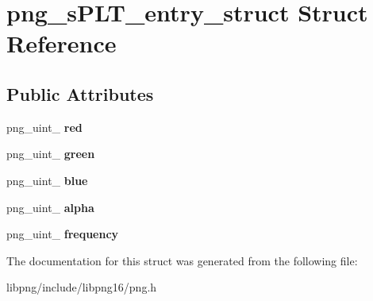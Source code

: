 \hypertarget{structpng__sPLT__entry__struct}{\section{png\-\_\-s\-P\-L\-T\-\_\-entry\-\_\-struct Struct Reference}
\label{structpng__sPLT__entry__struct}
}
\subsection*{Public Attributes}
\begin{DoxyCompactItemize}
\item 
\hypertarget{structpng__sPLT__entry__struct_a05ba3cef8aa2c43d1f52c0300c525fd9}{png\-\_\-uint\-\_ {\bfseries red}}\label{structpng__sPLT__entry__struct_a05ba3cef8aa2c43d1f52c0300c525fd9}

\item 
\hypertarget{structpng__sPLT__entry__struct_a3b4269fb63b4087bd618a6741b805554}{png\-\_\-uint\-\_ {\bfseries green}}\label{structpng__sPLT__entry__struct_a3b4269fb63b4087bd618a6741b805554}

\item 
\hypertarget{structpng__sPLT__entry__struct_a2af6281d3b400362886a43977ebcb7db}{png\-\_\-uint\-\_ {\bfseries blue}}\label{structpng__sPLT__entry__struct_a2af6281d3b400362886a43977ebcb7db}

\item 
\hypertarget{structpng__sPLT__entry__struct_abea98962a064e2a05f460b9f2ea2f47b}{png\-\_\-uint\-\_ {\bfseries alpha}}\label{structpng__sPLT__entry__struct_abea98962a064e2a05f460b9f2ea2f47b}

\item 
\hypertarget{structpng__sPLT__entry__struct_ad8095a15bb5a054c12ef911478c5f3a3}{png\-\_\-uint\-\_ {\bfseries frequency}}\label{structpng__sPLT__entry__struct_ad8095a15bb5a054c12ef911478c5f3a3}

\end{DoxyCompactItemize}


The documentation for this struct was generated from the following file\-:\begin{DoxyCompactItemize}
\item 
libpng/include/libpng16/png.\-h\end{DoxyCompactItemize}
